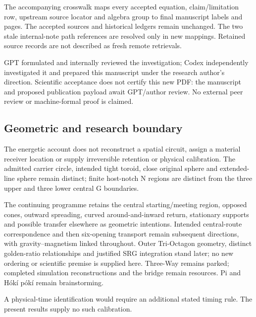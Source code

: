 The accompanying crosswalk maps every accepted equation, claim/limitation row, upstream source locator and algebra group to final manuscript labels and pages. The accepted sources and historical ledgers remain unchanged. The two stale internal-note path references are resolved only in new mappings. Retained source records are not described as fresh remote retrievals.

GPT formulated and internally reviewed the investigation; Codex independently investigated it and prepared this manuscript under the research author's direction. Scientific acceptance does not certify this new PDF: the manuscript and proposed publication payload await GPT/author review. No external peer review or machine-formal proof is claimed.

\subsection{Geometric and research boundary}\label{sec:continuity}
The energetic account does not reconstruct a spatial circuit, assign a material receiver location or supply irreversible retention or physical calibration. The admitted carrier circle, intended tight toroid, close original sphere and extended-line sphere remain distinct; finite host-notch N regions are distinct from the three upper and three lower central G boundaries.

The continuing programme retains the central starting/meeting region, opposed cones, outward spreading, curved around-and-inward return, stationary supports and possible transfer elsewhere as geometric intentions. Intended central-route correspondence and then six-opening transport remain subsequent directions, with gravity--magnetism linked throughout. Outer Tri-Octagon geometry, distinct golden-ratio relationships and justified SRG integration stand later; no new ordering or scientific premise is supplied here. Three-Way remains parked; completed simulation reconstructions and the bridge remain resources. Pi and H\'ok\'i p\'ok\'i remain brainstorming.

A physical-time identification would require an additional stated timing rule. The present results supply no such calibration.
